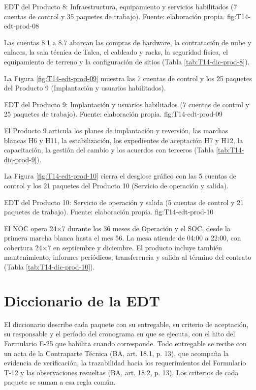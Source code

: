   {EDT del Producto 8: Infraestructura, equipamiento y servicios habilitados (7 cuentas de control y 35 paquetes de trabajo). Fuente: elaboración propia.}
  {fig:T14-edt-prod-08}

Las cuentas 8.1 a 8.7 abarcan las compras de hardware, la contratación de nube y enlaces, la sala técnica de Talca, el cableado y racks, la seguridad física, el equipamiento de terreno y la configuración de sitios (Tabla \ref{tab:T14-dic-prod-8}).

La Figura \ref{fig:T14-edt-prod-09} muestra las 7 cuentas de control y los 25 paquetes del Producto 9 (Implantación y usuarios habilitados).

  {EDT del Producto 9: Implantación y usuarios habilitados (7 cuentas de control y 25 paquetes de trabajo). Fuente: elaboración propia.}
  {fig:T14-edt-prod-09}

El Producto 9 articula los planes de implantación y reversión, las marchas blancas H6 y H11, la estabilización, los expedientes de aceptación H7 y H12, la capacitación, la gestión del cambio y los acuerdos con terceros (Tabla \ref{tab:T14-dic-prod-9}).

La Figura \ref{fig:T14-edt-prod-10} cierra el desglose gráfico con las 5 cuentas de control y los 21 paquetes del Producto 10 (Servicio de operación y salida).

  {EDT del Producto 10: Servicio de operación y salida (5 cuentas de control y 21 paquetes de trabajo). Fuente: elaboración propia.}
  {fig:T14-edt-prod-10}
\clearpage

El NOC opera 24\ensuremath{\times}7 durante los 36 meses de Operación y el SOC, desde la primera marcha blanca hasta el mes 56. La mesa atiende de 04:00 a 22:00, con cobertura 24\ensuremath{\times}7 en septiembre y diciembre. El producto incluye también mantenimiento, informes periódicos, transferencia y salida al término del contrato (Tabla \ref{tab:T14-dic-prod-10}).

\section{Diccionario de la EDT}

El diccionario describe cada paquete con su entregable, su criterio de aceptación, su responsable y el período del cronograma en que se ejecuta, con el hito del Formulario E-25 que habilita cuando corresponde. Todo entregable se recibe con un acta de la Contraparte Técnica (BA, art. 18.1, p. 13), que acompaña la evidencia de verificación, la trazabilidad hacia los requerimientos del Formulario T-12 y las observaciones resueltas (BA, art. 18.2, p. 13). Los criterios de cada paquete se suman a esa regla común.

